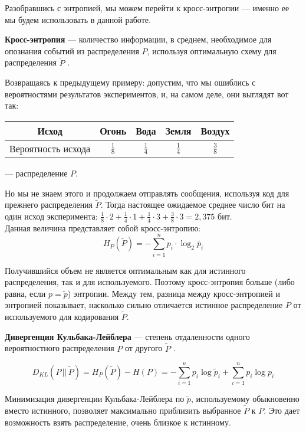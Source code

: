 Разобравшись с энтропией, мы можем перейти к кросс-энтропии --- именно ее мы будем использовать в данной работе.

{\bfseries Кросс-энтропия} --- количество информации, в среднем, необходимое для опознания событий из распределения $P$, используя оптимальную схему для распределения $\tilde P$ \cite{entropy}.

Возвращаясь к предыдущему примеру: допустим, что мы ошиблись с вероятностями результатов экспериментов, и, на самом деле, они выглядят вот так:

\begin{center}
\setlength{\extrarowheight}{3mm}
\begin{tabular}{|c|c|c|c|c|}
	\hline
	Исход & Огонь & Вода & Земля & Воздух\\[2mm]
	\hline
	Вероятность исхода & $\displaystyle\frac{1}{8}$ & $\displaystyle\frac{1}{4}$ & $\displaystyle\frac{1}{4}$ & $\displaystyle\frac{3}{8}$\\[3mm]
	\hline
\end{tabular}
\end{center}

--- распределение $P$.

Но мы не знаем этого и продолжаем отправлять сообщения, используя код для прежнего распределения $\tilde P$. Тогда настоящее ожидаемое среднее число бит на один исход эксперимента: $\displaystyle\frac{1}{8} \cdot 2  + \frac{1}{4} \cdot 1  + \frac{1}{4} \cdot 3 + \frac{3}{8} \cdot 3 = 2,375$ бит.\\[1mm]
Данная величина представляет собой кросс-энтропию:
\begin{equation}
	H_P(\tilde P) = - \sum_{i=1}^{n} p_i \cdot \log_2 \tilde{p_i}
\end{equation}

Получившийся объем не является оптимальным как для истинного распределения, так и для используемого. Поэтому кросс-энтропия больше (либо равна, если $p = \tilde p$) энтропии. Между тем, разница между кросс-энтропией и энтропией показывает, насколько сильно отличается истинное распределение $P$ от используемого для кодирования $\tilde P$.

{\bfseries Дивергенция Кульбака-Лейблера} --- степень отдаленности одного вероятностного распределения $P$ от другого $\tilde P$ \cite{entropy}.

\begin{equation}
	D_{KL}(P\, ||\, \tilde P)= H_P(\tilde P) - H(P) = - \sum\limits_{i=1}^n p_i\log \tilde p_i + \sum\limits_{i=1}^n p_i\log p_i
\end{equation}

Минимизация дивергенции Кульбака-Лейблера по $\tilde p$, используемому обыкновенно вместо истинного, позволяет максимально приблизить выбранное $\tilde P$ к $P$. Это дает возможность взять распределение, очень близкое к истинному.